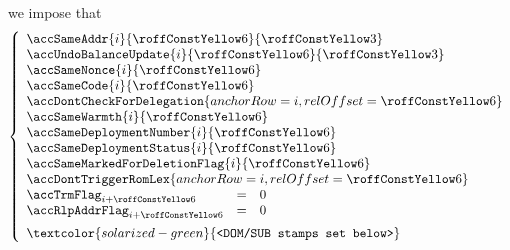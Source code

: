 \item[\underline{\underline{Second \callerName{} account-row $n^°(i + \callSecondCallerAccountRowOffset)$:}}]
	we impose that
	\[
		\left\{ \begin{array}{lcl}
			\multicolumn{3}{l}{\accSameAddr                      {i}{\callSecondCallerAccountRowOffset}{\callFirstCallerAccountRowOffset}} \\
			\multicolumn{3}{l}{\accUndoBalanceUpdate             {i}{\callSecondCallerAccountRowOffset}{\callFirstCallerAccountRowOffset}} \\
			\multicolumn{3}{l}{\accSameNonce                     {i}{\callSecondCallerAccountRowOffset}} \\
			\multicolumn{3}{l}{\accSameCode                      {i}{\callSecondCallerAccountRowOffset}} \\
			\multicolumn{3}{l}{\accDontCheckForDelegation        { anchorRow = i, relOffset = \callSecondCallerAccountRowOffset } } \\
			\multicolumn{3}{l}{\accSameWarmth                    {i}{\callSecondCallerAccountRowOffset}} \\
			\multicolumn{3}{l}{\accSameDeploymentNumber          {i}{\callSecondCallerAccountRowOffset}} \\
			\multicolumn{3}{l}{\accSameDeploymentStatus          {i}{\callSecondCallerAccountRowOffset}} \\
			\multicolumn{3}{l}{\accSameMarkedForDeletionFlag     {i}{\callSecondCallerAccountRowOffset}} \\
			\multicolumn{3}{l}{\accDontTriggerRomLex             { anchorRow = i, relOffset = \callSecondCallerAccountRowOffset } } \\
			\accTrmFlag      _{i + \callSecondCallerAccountRowOffset} & = & 0 \\
			\accRlpAddrFlag  _{i + \callSecondCallerAccountRowOffset} & = & 0 \vspace{2mm} \\
			\multicolumn{3}{l}{\textcolor{solarized-green}{\texttt{<DOM/SUB stamps set below>}}} \\
		\end{array} \right.
	\]
